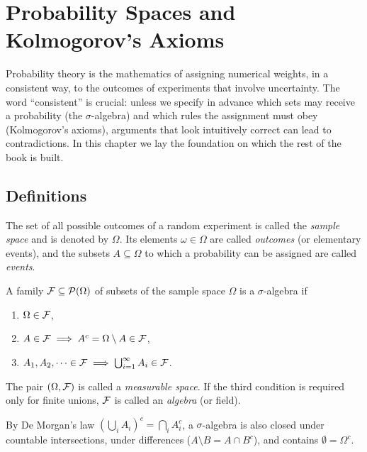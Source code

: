 \documentclass[main.tex]{subfiles}
\begin{document}
\chapter{Probability Spaces and Kolmogorov's Axioms}\label{ch:olasilik-uzaylari}

Probability theory is the mathematics of assigning numerical weights, in a consistent way, to the outcomes of experiments that involve uncertainty. The word ``consistent'' is crucial: unless we specify in advance which sets may receive a probability (the $\sigma$-algebra) and which rules the assignment must obey (Kolmogorov's axioms), arguments that look intuitively correct can lead to contradictions. In this chapter we lay the foundation on which the rest of the book is built.

\section{Definitions}

\begin{definition}
The set of all possible outcomes of a random experiment is called the \emph{sample space} and is denoted by $\Omega$. Its elements $\omega\in\Omega$ are called \emph{outcomes} (or elementary events), and the subsets $A\subseteq\Omega$ to which a probability can be assigned are called \emph{events}.
\end{definition}

\begin{definition}\label{def:sigma-cebiri}
A family $\mathcal{F} \subseteq \mathcal{P}(\Omega)$ of subsets of the sample space $\Omega$ is a $\sigma$-algebra if
\begin{enumerate}
    \item $\Omega \in \mathcal{F}$,
    \item $A \in \mathcal{F} \implies A^c = \Omega \setminus A \in \mathcal{F}$,
    \item $A_1, A_2, \dots \in \mathcal{F} \implies \bigcup_{i=1}^\infty A_i \in \mathcal{F}$.
\end{enumerate}
The pair $(\Omega,\mathcal{F})$ is called a \emph{measurable space}. If the third condition is required only for finite unions, $\mathcal{F}$ is called an \emph{algebra} (or field).
\end{definition}

\begin{remark}
By De Morgan's law $\left(\bigcup_i A_i\right)^c = \bigcap_i A_i^c$, a $\sigma$-algebra is also closed under countable intersections, under differences ($A\setminus B = A\cap B^c$), and contains $\emptyset=\Omega^c$.
\end{remark}
\end{document}
